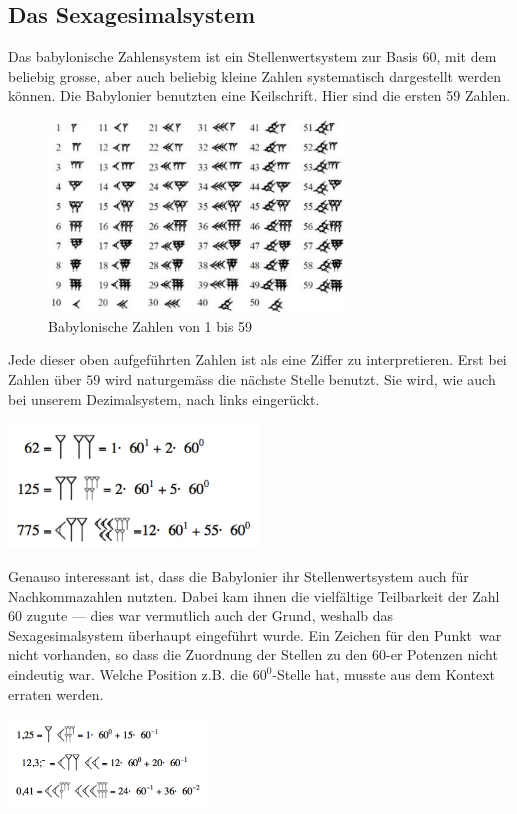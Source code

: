 \documentclass[%
11pt,%
twoside,%
titlepage,%
swissgerman,%
headsepline%
]{scrartcl}
\theoremstyle{definition}
\theoremstyle{plain}
\begin{document}
\subsection{Das Sexagesimalsystem}

Das babylonische Zahlensystem ist ein Stellenwertsystem zur Basis 60, mit dem beliebig grosse, aber auch beliebig kleine Zahlen systematisch dargestellt werden können. Die Babylonier benutzten eine Keilschrift. Hier sind die ersten 59 Zahlen.

\begin{figure}[h]
\begin{center}
\includegraphics[width=0.7\textwidth]{pictures/babylonzahlen}
\end{center}
\caption{Babylonische Zahlen von 1 bis 59}
\end{figure}

Jede dieser oben aufgeführten Zahlen ist als eine Ziffer zu interpretieren. Erst bei Zahlen über $59$ wird naturgemäss die nächste Stelle benutzt. Sie wird, wie auch bei unserem Dezimalsystem, nach links eingerückt.

\begin{center}
\includegraphics[width=0.5\textwidth]{pictures/babylongrossezahlen}
\end{center}
Genauso interessant ist, dass die Babylonier ihr Stellenwertsystem auch für Nachkommazahlen nutzten. Dabei kam ihnen die vielfältige Teilbarkeit der Zahl 60 zugute --- dies war vermutlich auch der Grund, weshalb das Sexagesimalsystem überhaupt eingeführt wurde. Ein Zeichen für den \glqq Punkt\grqq\ war nicht vorhanden, so dass die Zuordnung der Stellen zu den $60$-er Potenzen nicht eindeutig war. Welche Position z.B. die $60^0$-Stelle hat, musste aus dem Kontext erraten werden.
\begin{center}
\includegraphics[width=0.4\textwidth]{pictures/babylonnachkomma}
\end{center}
\end{document}
